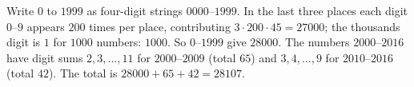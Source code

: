 Write $0$ to $1999$ as four-digit strings $0000$--$1999$. In the last three places each digit $0$--$9$ appears $200$ times per place, contributing $3\cdot200\cdot45=27000$; the thousands digit is $1$ for $1000$ numbers: $1000$. So $0$--$1999$ give $28000$. The numbers $2000$--$2016$ have digit sums $2,3,\dots,11$ for $2000$--$2009$ (total $65$) and $3,4,\dots,9$ for $2010$--$2016$ (total $42$). The total is $28000+65+42=\boxed{28107}$.
